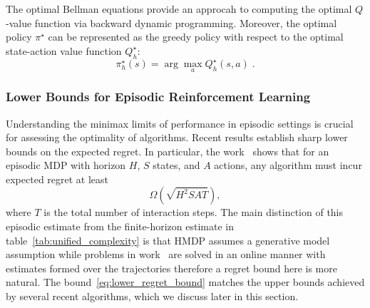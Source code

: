 \documentclass{article}
\numberwithin{equation}{section}
\newcommand{\eqsp}{\;}
\begin{document}
The optimal Bellman equations provide an approcah to computing the optimal \(Q\)-value function via backward dynamic programming. Moreover, the optimal policy \(\pi^\star\) can be represented as the greedy policy with respect to the optimal state-action value function \(Q^\star_h:\)
\[\pi_h^\star(s) = \arg \max_{a}Q^\star_h(s,a)\eqsp.\]
\subsubsection{Lower Bounds for Episodic Reinforcement Learning}
Understanding the minimax limits of performance in episodic settings is crucial for assessing the optimality of algorithms. Recent results establish sharp lower bounds on the expected regret. In particular, {the work~\cite{domingues2021episodic} shows} that for an episodic MDP with horizon $H$, $S$ states, and $A$ actions, any algorithm must incur expected regret at least
\begin{equation}\label{eq:lower_regret_bound}
    \Omega\!\left(\sqrt{H^2SA T}\right),
\end{equation}
where $T$ is the total number of interaction steps. The main distinction of this episodic estimate from the finite-horizon estimate in table~\ref{tab:unified_complexity} is that HMDP assumes a generative model assumption while problems in work~\cite{domingues2021episodic} are solved in an online manner with estimates formed over the trajectories therefore a regret bound here is more natural.
The bound~\eqref{eq:lower_regret_bound} matches the upper bounds achieved by several recent algorithms, which we discuss later in this section.
\end{document}
